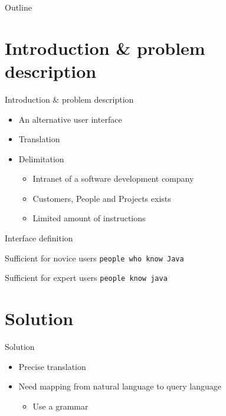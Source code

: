 \documentclass{beamer}
\begin{document}
\begin{frame}{Outline}
  \tableofcontents
\end{frame}

\section{Introduction \& problem description}
\begin{frame}{Introduction \& problem description} 
    \begin{itemize}
    \item An alternative user interface \pause
    \item Translation \pause %
    \item Delimitation 
      \begin{itemize}
        \item Intranet of a software development company
        \item Customers, People and Projects exists
	    \item Limited amount of instructions
      \end{itemize}
  \end{itemize} 
\end{frame}

\begin{frame}{Interface definition} 
\begin{block}{Sufficient for novice users}
      \texttt{people who know Java}
\end{block}
\pause
\begin{block}{Sufficient for expert users}
      \texttt{people know java}
\end{block}
\end{frame}

\section{Solution} 
\begin{frame}{Solution} 
  \begin{itemize}
    \item Precise translation \pause
    \item Need mapping from natural language to query language \pause
      \begin{itemize}
        \item Use a grammar
      \end{itemize}
  \end{itemize}
  
\end{frame}
\end{document}
